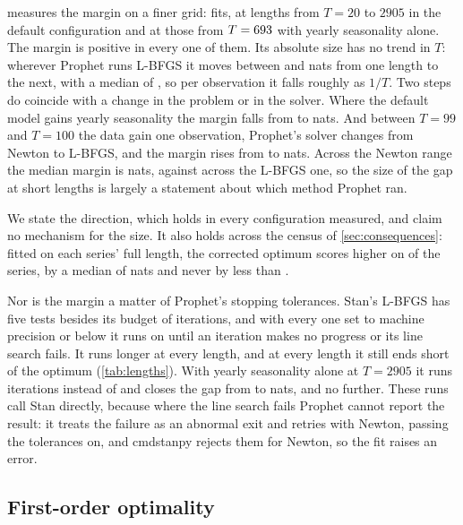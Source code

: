  measures the margin on a finer grid: \MarginCells{} fits, at
\MarginLengths{} lengths from $T = 20$ to $2905$ in the default configuration and at
those from $T = 693$ with yearly seasonality alone. The margin is
positive in every one of them. Its absolute size has no trend in $T$: wherever
Prophet runs L-BFGS it moves between \MarginLbfgsMin{} and \MarginLbfgsMax{} nats from
one length to the next, with a median of \MarginLbfgsMedian, so per observation it
falls roughly as $1/T$. Two steps do coincide with a change in the problem or in the
solver. Where the default model gains yearly seasonality the margin falls from
\MarginBeforeYearly{} to \MarginAfterYearly{} nats. And between $T = 99$ and
$T = 100$ the data gain one observation, Prophet's solver changes from Newton to
L-BFGS, and the margin rises from \MarginAtNinetyNine{} to \MarginAtHundred{} nats.
Across the Newton range the median margin is \MarginNewtonMedian{} nats, against
\MarginLbfgsMedian{} across the L-BFGS one, so the size of the gap at short lengths is
largely a statement about which method Prophet ran.

We state the direction, which holds in every configuration measured, and claim no
mechanism for the size. It also holds across the census of \cref{sec:consequences}:
fitted on each series' full length, the corrected optimum scores higher on
\KktLpWins{} of the \KktSeries{} series, by a median of \KktLpMedian{} nats and never
by less than \KktLpMin.

Nor is the margin a matter of Prophet's stopping tolerances. Stan's L-BFGS has five
tests besides its budget of iterations, and with every one set to machine precision or
below it runs on until an iteration makes no progress or its line search fails. It
runs longer at every length, and at every length it still ends short of the optimum
(\cref{tab:lengths}). With yearly seasonality alone at $T = 2905$ it runs
\TolFiveIterYearly{} iterations instead of \TolDefaultIterYearly{} and closes the gap
from \TolDefaultShortYearly{} to \TolFiveShortYearly{} nats, and no further. These runs
call Stan directly, because where the line search fails Prophet cannot report the
result: it treats the failure as an abnormal exit and retries with Newton, passing the
tolerances on, and cmdstanpy rejects them for Newton, so the fit raises an error.

\subsection{First-order optimality}
\label{sec:evidence:kkt}

